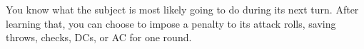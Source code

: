 \spellrng{\rngmed}
\begin{spelleffect}
You know what the subject is most likely going to do during its next turn. After learning that, you can choose to impose a  penalty to its attack rolls, saving throws, checks, DCs, or AC for one round.
\end{spelleffect}
